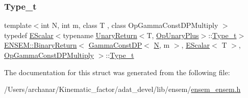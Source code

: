 \subsubsection{\texorpdfstring{Type\_t}{Type\_t}\hspace{0.1cm}{\footnotesize\ttfamily [2/2]}}
{\footnotesize\ttfamily template$<$int N, int m, class T , class Op\+Gamma\+Const\+D\+P\+Multiply $>$ \\
typedef \mbox{\hyperlink{classENSEM_1_1EScalar}{E\+Scalar}}$<$typename \mbox{\hyperlink{structENSEM_1_1UnaryReturn}{Unary\+Return}}$<$T, \mbox{\hyperlink{structENSEM_1_1OpUnaryPlus}{Op\+Unary\+Plus}}$>$\+::\mbox{\hyperlink{structENSEM_1_1BinaryReturn_3_01GammaConstDP_3_01N_00_01m_01_4_00_01EScalar_3_01T_01_4_00_01OpGammaConstDPMultiply_01_4_a27aeae298785ac9baf364166d0cdb469}{Type\+\_\+t}}$>$ \mbox{\hyperlink{structENSEM_1_1BinaryReturn}{E\+N\+S\+E\+M\+::\+Binary\+Return}}$<$ \mbox{\hyperlink{classENSEM_1_1GammaConstDP}{Gamma\+Const\+DP}}$<$ \mbox{\hyperlink{operator__name__util_8cc_a7722c8ecbb62d99aee7ce68b1752f337}{N}}, m $>$, \mbox{\hyperlink{classENSEM_1_1EScalar}{E\+Scalar}}$<$ T $>$, \mbox{\hyperlink{structENSEM_1_1OpGammaConstDPMultiply}{Op\+Gamma\+Const\+D\+P\+Multiply}} $>$\+::\mbox{\hyperlink{structENSEM_1_1BinaryReturn_3_01GammaConstDP_3_01N_00_01m_01_4_00_01EScalar_3_01T_01_4_00_01OpGammaConstDPMultiply_01_4_a27aeae298785ac9baf364166d0cdb469}{Type\+\_\+t}}}



The documentation for this struct was generated from the following file\+:\begin{DoxyCompactItemize}
\item 
/\+Users/archanar/\+Kinematic\+\_\+factor/adat\+\_\+devel/lib/ensem/\mbox{\hyperlink{lib_2ensem_2ensem__ensem_8h}{ensem\+\_\+ensem.\+h}}\end{DoxyCompactItemize}
